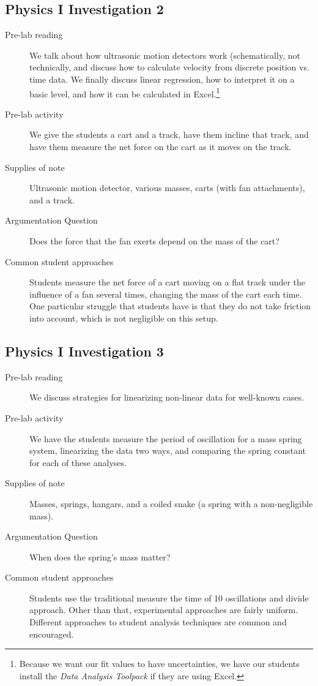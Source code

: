 \documentclass[aip, numerical, preprint]{revtex4-2}
\begin{document}
\subsection{Physics \textrm{I} Investigation 2}
\begin{description}
  \item[Pre-lab reading] We talk about how ultrasonic motion detectors work (schematically, not
  technically, and discuss how to calculate velocity from discrete position vs. time data. We
  finally discuss linear regression, how to interpret it on a basic level, and how it can be
  calculated in Excel.\footnote{Because we want our fit values to have uncertainties, we have
    our students install the \textit{Data Analysis Toolpack} if they are using Excel.}
  \item[Pre-lab activity] We give the students a cart and a track, have them incline that
  track, and have them measure the net force on the cart as it moves on the track.
  \item[Supplies of note] Ultrasonic motion detector, various masses, carts (with fan
  attachments), and a track.
  \item[Argumentation Question] Does the force that the fan exerts depend on the mass of the
  cart?
  \item[Common student approaches] Students measure the net force of a cart moving on a flat
  track under the influence of a fan several times, changing the mass of the cart each time.
  One particular struggle that students have is that they do not take friction into account,
  which is not negligible on this setup.
\end{description}

\subsection{Physics \textrm{I} Investigation 3}
\begin{description}
  \item[Pre-lab reading] We discuss strategies for linearizing non-linear data for well-known
  cases.
  \item[Pre-lab activity] We have the students measure the period of oscillation for a mass
  spring system, linearizing the data two ways, and comparing the spring constant for each of
  these analyses.
  \item[Supplies of note] Masses, springs, hangars, and a coiled snake (a spring with a
  non-negligible mass).
  \item[Argumentation Question] When does the spring's mass matter?
  \item[Common student approaches] Students use the traditional measure the time of 10
  oscillations and divide approach.  Other than that, experimental approaches are fairly
  uniform.  Different approaches to student analysis techniques are common and encouraged.
\end{description}
\end{document}
